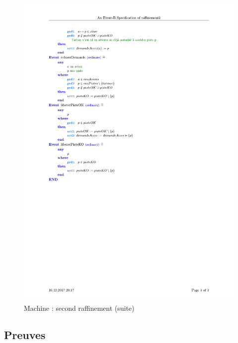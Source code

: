 \begin{figure}[H]
	\begin{center}	
		
		\includegraphics[scale=0.75]{images/2/raf23.pdf}
		\caption{ Machine : second raffinement (suite)}
		\label{raf23}
	\end{center}
\end{figure}


\subsection{Preuves}


